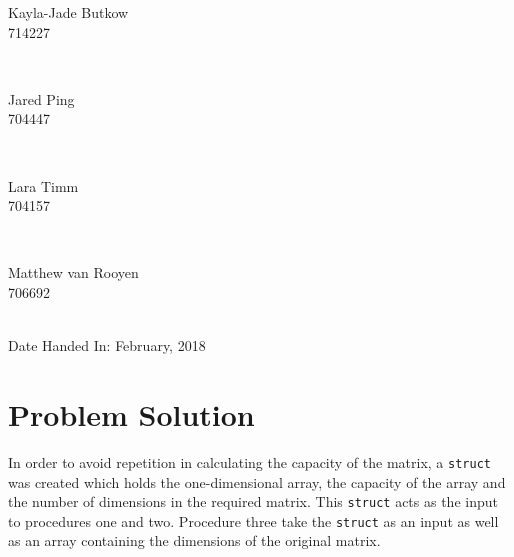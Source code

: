 \documentclass[10pt,twocolumn]{witseiepaper}
\begin{document}
\begin{titlepage}
\begin{minipage}{0.4\textwidth}
	\begin{flushleft} \large
		Kayla-Jade Butkow \\ 714227 %
	\end{flushleft}
\end{minipage}
~
\begin{minipage}{0.4\textwidth}
	\begin{flushright} \large
		Jared Ping \\ 704447
	\end{flushright}
\end{minipage}\\[1cm]

\begin{minipage}{0.4\textwidth}
	\begin{flushleft} \large
		Lara Timm \\ 704157
	\end{flushleft}
\end{minipage}
~
\begin{minipage}{0.4\textwidth}
	\begin{flushright} \large
		Matthew van Rooyen \\ 706692
	\end{flushright}
\end{minipage}\\[1cm]
		
		
	
{\large Date Handed In:  February, 2018}\\[1cm] 
	
\end{titlepage}



\pagestyle{plain}
\setcounter{page}{1}

\section{Problem Solution}
In order to avoid repetition in calculating the capacity of the matrix, a \texttt{struct} was created which holds the one-dimensional array, the capacity of the array and the number of dimensions in the required matrix. This \texttt{struct} acts as the input to procedures one and two. Procedure three take the \texttt{struct} as an input as well as an array containing the dimensions of the original matrix.
\end{document}
